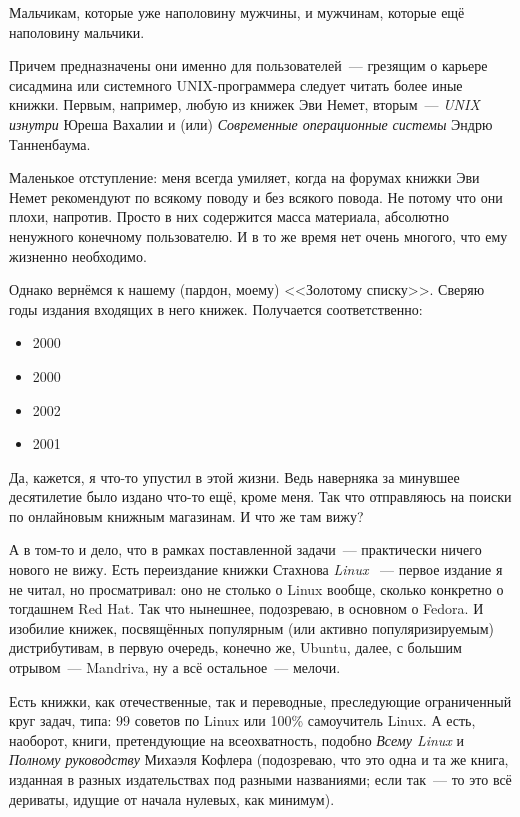 \begin{shadequote}{}
Мальчикам, которые уже наполовину мужчины, и мужчинам, которые ещё наполовину мальчики.
\end{shadequote}

Причем предназначены они именно для пользователей~--- грезящим о карьере сисадмина или системного UNIX-программера следует читать более иные книжки. Первым, например, любую из книжек Эви Немет, вторым~--- 
\textit{UNIX изнутри}
 Юреша Вахалии и (или) 
\textit{Современные операционные системы}
 Эндрю Танненбаума.

Маленькое отступление: меня всегда умиляет, когда на форумах книжки Эви Немет рекомендуют по всякому поводу и без всякого повода. Не потому что они плохи, напротив. Просто в них содержится масса материала, абсолютно ненужного конечному пользователю. И в то же время нет очень многого, что ему жизненно необходимо.

Однако вернёмся к нашему (пардон, моему) <<Золотому списку>>. Сверяю годы издания входящих в него книжек. Получается соответственно:

\begin{itemize}
	\item 2000
	\item 2000
	\item 2002
	\item 2001
\end{itemize}



Да, кажется, я что-то упустил в этой жизни. Ведь наверняка за минувшее десятилетие было издано что-то ещё, кроме меня. Так что отправляюсь на поиски по онлайновым книжным магазинам. И что же там вижу?

А в том-то и дело, что в рамках поставленной задачи~--- практически ничего нового не вижу. Есть переиздание книжки Стахнова 
\textit{Linux}
~--- первое издание я не читал, но просматривал: оно не столько о Linux вообще, сколько конкретно о тогдашнем Red Hat. Так что нынешнее, подозреваю, в основном о Fedora. И изобилие книжек, посвящённых популярным (или активно популяризируемым) дистрибутивам, в первую очередь, конечно же, Ubuntu, далее, с большим отрывом~--- Mandriva, ну а всё остальное~--- мелочи.

Есть книжки, как отечественные, так и переводные, преследующие ограниченный круг задач, типа: 99 советов по Linux или 100\% самоучитель Linux. А есть, наоборот, книги, претендующие на всеохватность, подобно 
\textit{Всему Linux}
 и 
\textit{Полному руководству}
 Михаэля Кофлера (подозреваю, что это одна и та же книга, изданная в разных издательствах под разными названиями; если так~--- то это всё дериваты, идущие от начала нулевых, как минимум).


